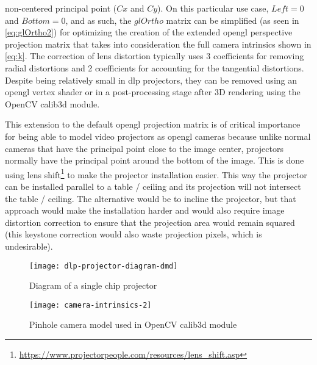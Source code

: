 non-centered principal point ($Cx$ and $Cy$). On this particular use case, $Left=0$ and $Bottom=0$, and as such, the $glOrtho$ matrix can be simplified (as seen in \cref{eq:glOrtho2}) for optimizing the creation of the extended \gls{opengl} perspective projection matrix that takes into consideration the full camera intrinsics shown in \cref{eq:k}. The correction of lens distortion typically uses 3 coefficients for removing radial distortions and 2 coefficients for accounting for the tangential distortions. Despite being relatively small in \gls{dlp} projectors, they can be removed using an \gls{opengl} vertex shader or in a post-processing stage after 3D rendering using the OpenCV calib3d module.

This extension to the default \gls{opengl} projection matrix is of critical importance for being able to model video projectors as \gls{opengl} cameras because unlike normal cameras that have the principal point close to the image center, projectors normally have the principal point around the bottom of the image. This is done using lens shift\footnote{\url{https://www.projectorpeople.com/resources/lens_shift.asp}} to make the projector installation easier. This way the projector can be installed parallel to a table / ceiling and its projection will not intersect the table / ceiling. The alternative would be to incline the projector, but that approach would make the installation harder and would also require image distortion correction to ensure that the projection area would remain squared (this keystone correction would also waste projection pixels, which is undesirable).
\vspace{-0.6em}
\begin{figure}[H]
	\centering
	\texttt{[image: dlp-projector-diagram-dmd]}
	\caption[Diagram of a single chip  projector]{Diagram of a single chip  projector\protect\footnotemark}
	\label{fig:dlp-projector-diagram-dmd}
	\vspace{-0.7em}
\end{figure}
\vspace{-0.9em}
\begin{figure}[H]
	\centering
	\texttt{[image: camera-intrinsics-2]}
	\caption[Pinhole camera model used in OpenCV calib3d module]{Pinhole camera model used in OpenCV calib3d module\protect\footnotemark}
	\label{fig:camera-intrinsics-2}
	\vspace{-0.7em}
\end{figure}
